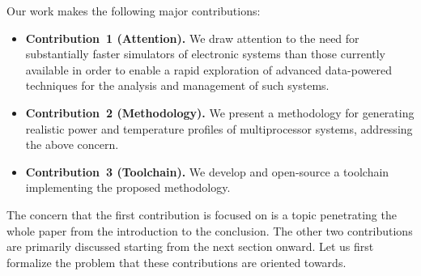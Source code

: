 Our work makes the following major contributions:

\begin{itemize}
  \item {\bfseries Contribution~1 (Attention).} We draw attention to the need
  for substantially faster simulators of electronic systems than those currently
  available in order to enable a rapid exploration of advanced data-powered
  techniques for the analysis and management of such systems.

  \item {\bfseries Contribution~2 (Methodology).} We present a methodology for
  generating realistic power and temperature profiles of multiprocessor systems,
  addressing the above concern.

  \item {\bfseries Contribution~3 (Toolchain).} We develop and open-source a
  toolchain implementing the proposed methodology.
\end{itemize}

The concern that the first contribution is focused on is a topic penetrating the
whole paper from the introduction to the conclusion. The other two contributions
are primarily discussed starting from the next section onward. Let us first
formalize the problem that these contributions are oriented towards.
